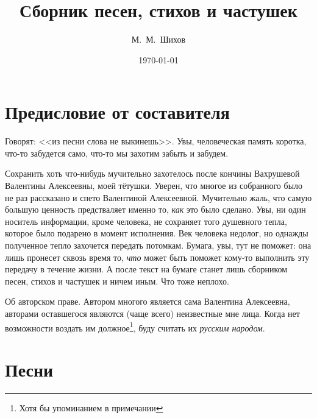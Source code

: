 \documentclass[a4paper,oneside,14pt]{scrbook}
\title{Сборник песен, стихов и частушек}
\author{М.~М.~Шихов}
\date{\today}
\begin{document}
    \maketitle
    \tableofcontents
    \renewcommand{\poemtoc}{subsection}
    \newcommand{\attrib}[1]{\nopagebreak{\raggedleft\footnotesize #1\par}}

    \chapter*{Предисловие от составителя}
    
    Говорят: <<из песни слова не выкинешь>>. Увы, человеческая память коротка, что-то забудется само, что-то мы захотим забыть и забудем. 
    
    Сохранить хоть что-нибудь мучительно захотелось после кончины Вахрушевой Валентины Алексеевны, моей тётушки. Уверен, что многое из собранного было не раз рассказано и спето Валентиной Алексеевной. Мучительно жаль, что самую большую ценность предстваляет именно то, \emph{как} это было сделано. Увы, ни один носитель информации, кроме человека, не сохраняет того душевного тепла, которое было подарено в момент исполнения. Век человека недолог, но однажды полученное тепло захочется передать потомкам. Бумага, увы, тут не поможет: она лишь пронесет сквозь время то, \emph{что} может быть поможет кому-то выполнить эту передачу в течение жизни. А после текст на бумаге станет лишь сборником песен, стихов и частушек и ничем иным. Что тоже неплохо.
    
    Об авторском праве. Автором многого является сама Валентина Алексеевна, авторами оставшегося являются (чаще всего) неизвестные мне лица. Когда нет возможности воздать им должное\footnote{Хотя бы упоминанием в примечании}, буду считать их \emph{русским народом}. 
    
    \chapter{Песни}
    
\end{document}
